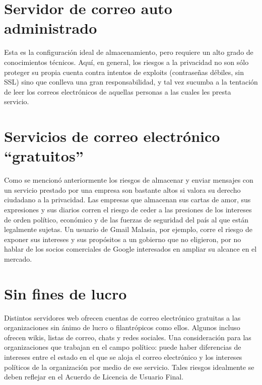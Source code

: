 \documentclass[10pt,a5paper,twoside,,]{book}
\begin{document}
\section{Servidor de correo auto
administrado}\label{servidor-de-correo-auto-administrado}

Esta es la configuración ideal de almacenamiento, pero requiere un alto
grado de conocimientos técnicos. Aquí, en general, los riesgos a la
privacidad no son sólo proteger su propia cuenta contra intentos de
exploits (contraseñas débiles, sin SSL) sino que conlleva una gran
responsabilidad, y tal vez sucumba a la tentación de leer los correos
electrónicos de aquellas personas a las cuales les presta servicio.

\section{\texorpdfstring{Servicios de correo electrónico
``gratuitos''}{Servicios de correo electrónico gratuitos}}\label{servicios-de-correo-electruxf3nico-gratuitos}

Como se mencionó anteriormente los riesgos de almacenar y enviar
mensajes con un servicio prestado por una empresa son bastante altos si
valora su derecho ciudadano a la privacidad. Las empresas que almacenan
sus cartas de amor, sus expresiones y sus diarios corren el riesgo de
ceder a las presiones de los intereses de orden político, económico y de
las fuerzas de seguridad del país al que están legalmente sujetas. Un
usuario de Gmail Malasia, por ejemplo, corre el riesgo de exponer sus
intereses y sus propósitos a un gobierno que no eligieron, por no hablar
de los socios comerciales de Google interesados en ampliar su alcance en
el mercado.

\section{Sin fines de lucro}\label{sin-fines-de-lucro}

Distintos servidores web ofrecen cuentas de correo electrónico gratuitas
a las organizaciones sin ánimo de lucro o filantrópicos como ellos.
Algunos incluso ofrecen wikis, listas de correo, chats y redes sociales.
Una consideración para las organizaciones que trabajan en el campo
político: puede haber diferencias de intereses entre el estado en el que
se aloja el correo electrónico y los intereses políticos de la
organización por medio de ese servicio. Tales riesgos idealmente se
deben reflejar en el Acuerdo de Licencia de Usuario Final.
\end{document}
